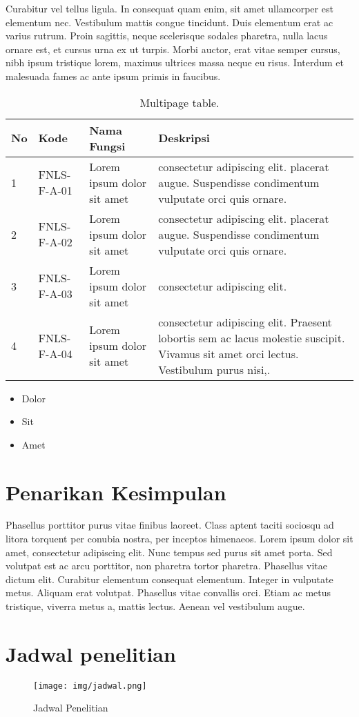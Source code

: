 Curabitur vel tellus ligula. In consequat quam enim, sit amet
ullamcorper est elementum nec. Vestibulum mattis congue
tincidunt. Duis elementum erat ac varius rutrum. Proin sagittis, neque
scelerisque sodales pharetra, nulla lacus ornare est, et cursus urna
ex ut turpis. Morbi auctor, erat vitae semper cursus, nibh ipsum
tristique lorem, maximus ultrices massa neque eu risus. Interdum et
malesuada fames ac ante ipsum primis in faucibus.

\begin{longtable}[c]{|l|l|p{3cm}|p{7cm}|} %
  \caption{Multipage table.}
  \label{tab:table1}\\
  \toprule
  \hline \textbf{No} & \textbf{Kode} & \textbf{Nama Fungsi} & \textbf{Deskripsi}\\ \hline
  \midrule
  \endfirsthead %
  \toprule
  \midrule
  \endhead %
  1 & FNLS-F-A-01 & Lorem ipsum dolor sit amet& consectetur adipiscing
  elit. placerat augue. Suspendisse condimentum vulputate orci quis ornare.\\ \hline
  2 & FNLS-F-A-02 & Lorem ipsum dolor sit amet& consectetur adipiscing
  elit. placerat augue. Suspendisse condimentum vulputate orci quis ornare.\\ \hline
  3 & FNLS-F-A-03 & Lorem ipsum dolor sit amet& consectetur adipiscing elit. \\ \hline
  4 & FNLS-F-A-04 & Lorem ipsum dolor sit amet& consectetur adipiscing elit.
  Praesent lobortis sem ac lacus molestie suscipit. Vivamus sit amet orci lectus.
  Vestibulum purus nisi,.\\ \hline
  \bottomrule
\end{longtable}

\begin{itemize}
\item Dolor
\item Sit
\item Amet
\end{itemize}


\section{Penarikan Kesimpulan}
\label{subsec:label}

Phasellus porttitor purus \textcite{warn} vitae finibus laoreet. Class
aptent taciti sociosqu ad litora torquent per conubia nostra, per
inceptos himenaeos. Lorem ipsum dolor sit amet, consectetur adipiscing
elit. Nunc tempus sed purus sit amet porta. Sed volutpat est ac arcu
porttitor, non pharetra tortor pharetra. Phasellus vitae dictum
elit. Curabitur elementum consequat elementum. Integer in vulputate
metus. Aliquam erat volutpat. Phasellus vitae convallis orci. Etiam ac
metus tristique, viverra metus a, mattis lectus. Aenean vel vestibulum
augue.

\section{Jadwal penelitian}
\label{subsec:label}

\begin{figure}[tph]
  \centering
  \texttt{[image: img/jadwal.png]}
  \caption{Jadwal Penelitian}
  \label{fig:jadwal-penelitian}
\end{figure}
